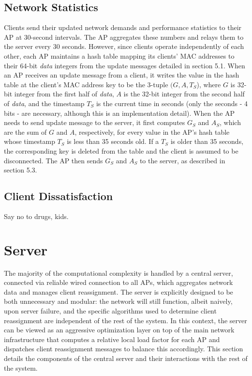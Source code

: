 \documentclass[10pt,journal,compsoc]{IEEEtran}
\begin{document}
		\subsection{Network Statistics}
		Clients send their updated network demands and performance statistics to their AP at 30-second intervals. The AP aggregates these numbers and relays them to the server every 30 seconds. However, since clients operate independently of each other, each AP maintains a hash table mapping its clients' MAC addresses to their 64-bit \textit{data} integers from the update messages detailed in section 5.1. When an AP receives an update message from a client, it writes the value in the hash table at the client's MAC address key to be the 3-tuple \((G, A, T_S\)), where \(G\) is 32-bit integer from the first half of \textit{data}, \(A\) is the 32-bit integer from the second half of \textit{data}, and the timestamp \(T_S\) is the current time in seconds (only the seconds - 4 bits - are necessary, although this is an implementation detail). When the AP needs to send  update message to the server, it first computes \(G_S\) and \(A_S\), which are the sum of \(G\) and \(A\), respectively, for every value in the AP's hash table whose timestamp \(T_S\) is less than 35 seconds old. If a \(T_S\) is older than 35 seconds, the corresponding key is deleted from the table and the client is assumed to be disconnected. The AP then sends \(G_S\) and \(A_S\) to the server, as described in section 5.3.
		
		\subsection{Client Dissatisfaction}
		Say no to drugs, kids.
		
		\section{Server}
		The majority of the computational complexity is handled by a central server, connected via reliable wired connection to all APs, which aggregates network data and manages client reassignment. The server is explicitly designed to be both unnecessary and modular: the network will still function, albeit naively, upon server failure, and the specific algorithms used to determine client reassignment are independent of the rest of the system. In this context, the server can be viewed as an aggressive optimization layer on top of the main network infrastructure that computes a relative local load factor for each AP and dispatches client reassignment messages to balance this accordingly. This section details the components of the central server and their interactions with the rest of the system.
		
\end{document}
